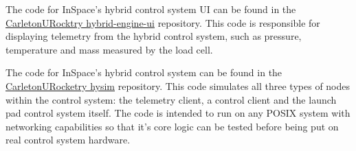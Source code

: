 The code for InSpace's hybrid control system UI can be found in the
\href{https://github.com/CarletonURocketry/hybrid-engine-ui}{CarletonURocktry hybrid-engine-ui} repository. This code
is responsible for displaying telemetry from the hybrid control system, such as pressure, temperature and mass measured
by the load cell.

The code for InSpace's hybrid control system can be found in the
\href{https://github.com/CarletonURocketry/hysim}{CarletonURocketry hysim} repository. This code simulates all three
types of nodes within the control system: the telemetry client, a control client and the launch pad control system
itself. The code is intended to run on any POSIX system with networking capabilities so that it's core logic can be
tested before being put on real control system hardware.
